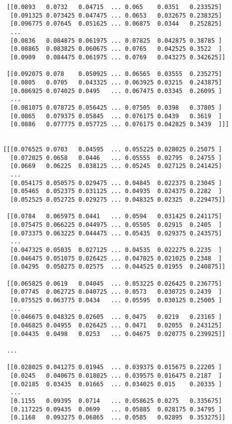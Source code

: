 \documentclass[
  letterpaper,
  DIV=11,
  numbers=noendperiod]{scrreprt}
\begin{document}
\begin{verbatim}
  [[0.0893   0.0732   0.04715  ... 0.065    0.0351   0.233525]
   [0.091325 0.073425 0.047475 ... 0.0653   0.032675 0.238325]
   [0.096775 0.07645  0.051625 ... 0.06875  0.0344   0.252825]
   ...
   [0.0836   0.084875 0.061975 ... 0.07825  0.042875 0.38785 ]
   [0.08865  0.083825 0.060675 ... 0.0765   0.042525 0.3522  ]
   [0.0909   0.084475 0.061975 ... 0.0769   0.043275 0.342625]]

  [[0.092075 0.078    0.050925 ... 0.06565  0.03555  0.235275]
   [0.0805   0.0705   0.043325 ... 0.063925 0.03215  0.243875]
   [0.086925 0.074025 0.0495   ... 0.067475 0.03345  0.26095 ]
   ...
   [0.081075 0.078725 0.056425 ... 0.07505  0.0398   0.37805 ]
   [0.0865   0.079375 0.05845  ... 0.076175 0.0439   0.3619  ]
   [0.0886   0.077775 0.057725 ... 0.076175 0.042825 0.3439  ]]]


 [[[0.076525 0.0703   0.04595  ... 0.055225 0.028025 0.25075 ]
   [0.072025 0.0658   0.0446   ... 0.05555  0.02795  0.24755 ]
   [0.0669   0.06225  0.038125 ... 0.05245  0.027125 0.241425]
   ...
   [0.054175 0.050575 0.029475 ... 0.04845  0.022375 0.23045 ]
   [0.05465  0.052375 0.031125 ... 0.04935  0.024375 0.2282  ]
   [0.052525 0.052725 0.029275 ... 0.048325 0.02325  0.229475]]

  [[0.0784   0.065975 0.0441   ... 0.0594   0.031425 0.241175]
   [0.075475 0.066225 0.044975 ... 0.05505  0.02915  0.2405  ]
   [0.073375 0.063225 0.044475 ... 0.05435  0.029375 0.243575]
   ...
   [0.047325 0.05035  0.027125 ... 0.04535  0.022275 0.2235  ]
   [0.046475 0.051075 0.026425 ... 0.047025 0.021025 0.2348  ]
   [0.04295  0.050275 0.02575  ... 0.044525 0.01955  0.240875]]

  [[0.065825 0.0619   0.04045  ... 0.053225 0.026425 0.236775]
   [0.07745  0.062725 0.040725 ... 0.0573   0.030725 0.2439  ]
   [0.075525 0.063775 0.0434   ... 0.05595  0.030125 0.25005 ]
   ...
   [0.046675 0.048325 0.02605  ... 0.0475   0.0219   0.23165 ]
   [0.046825 0.04955  0.026425 ... 0.0471   0.02055  0.243125]
   [0.04435  0.0498   0.0253   ... 0.04675  0.020775 0.239925]]

  ...

  [[0.028025 0.041275 0.01945  ... 0.039375 0.015675 0.22205 ]
   [0.0245   0.040675 0.018025 ... 0.039575 0.016475 0.2187  ]
   [0.02185  0.03435  0.01665  ... 0.034025 0.015    0.20335 ]
   ...
   [0.1155   0.09395  0.0714   ... 0.058625 0.0275   0.335675]
   [0.117225 0.09435  0.0699   ... 0.05885  0.028175 0.34795 ]
   [0.1168   0.093275 0.06865  ... 0.0585   0.02895  0.353275]]


\end{verbatim}
\end{document}
